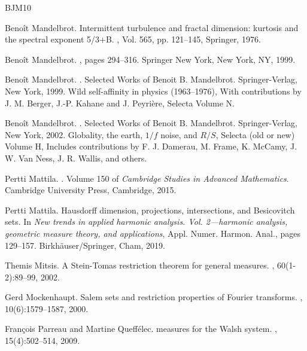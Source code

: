 \documentclass[12pt]{amsart}
\theoremstyle{definition}
\theoremstyle{remark}
\numberwithin{equation}{section}
\begin{document}
\begin{thebibliography}{BJM10}
	
	Beno\^{i}t Mandelbrot.
	\newblock 
	Intermittent turbulence and fractal dimension: kurtosis and the spectral exponent 5/3+B. 
	, Vol. 565, pp. 121--145,
	\newblock Springer, 1976.
	
	Beno\^{i}t Mandelbrot.
	, pages 294--316.
	\newblock Springer New York, New York, NY, 1999.
	
	Beno\^{i}t Mandelbrot.
	.
	\newblock Selected Works of Benoit B. Mandelbrot. Springer-Verlag, New York,
	1999.
	\newblock Wild self-affinity in physics (1963--1976), With contributions by J.
	M. Berger, J.-P. Kahane and J. Peyri\`ere, Selecta Volume N.
	
	
	
	Beno\^{i}t Mandelbrot.
	.
	\newblock Selected Works of Benoit B. Mandelbrot. Springer-Verlag, New York,
	2002.
	\newblock Globality, the earth, $1/f$ noise, and $R/S$, Selecta (old or new)
	Volume H, Includes contributions by F. J. Damerau, M. Frame, K. McCamy, J. W. Van Ness, J. R. Wallis, and others.
	
	
	
	Pertti Mattila.
	. Volume 150 of {\em
		Cambridge Studies in Advanced Mathematics}.
	\newblock Cambridge University Press, Cambridge, 2015.
	
	Pertti Mattila.
	\newblock Hausdorff dimension, projections, intersections, and {B}esicovitch
	sets.
	\newblock In {\em New trends in applied harmonic analysis. {V}ol. 2---harmonic
		analysis, geometric measure theory, and applications}, Appl. Numer. Harmon.
	Anal., pages 129--157. Birkh\"{a}user/Springer, Cham, 2019.
	
	Themis Mitsis.
	\newblock A {S}tein-{T}omas restriction theorem for general measures.
	, 60(1-2):89--99, 2002.
	
	Gerd Mockenhaupt.
	\newblock Salem sets and restriction properties of {F}ourier transforms.
	, 10(6):1579--1587, 2000.
	
	
	Fran\c{c}ois Parreau and Martine Queff\'{e}lec.
	 measures for the {W}alsh system.
	, 15(4):502--514, 2009.
	

\end{thebibliography}
\end{document}

